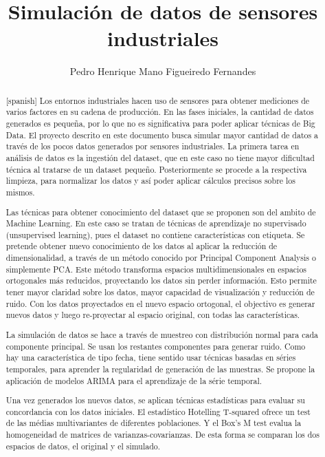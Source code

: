 \documentclass[11pt,spanish,listoffigures,listoftables]{tfgetsinf}
\title{Simulación de datos de sensores industriales}
\author{Pedro Henrique Mano Figueiredo Fernandes}
\begin{document}

\begin{abstract}[spanish]
Los entornos industriales hacen uso de sensores para obtener mediciones de varios factores en su cadena de producción. En las fases iniciales, la cantidad de datos generados es pequeña, por lo que no es significativa para poder aplicar técnicas de Big Data. El proyecto descrito en este documento busca simular mayor cantidad de datos a través de los pocos datos generados por sensores industriales. La primera tarea en análisis de datos es la ingestión del dataset, que en este caso no tiene mayor dificultad técnica al tratarse de un dataset pequeño. Posteriormente se procede a la respectiva limpieza, para normalizar los datos y así poder aplicar cálculos precisos sobre los mismos.

Las técnicas para obtener conocimiento del dataset que se proponen son del ambito de Machine Learning. En este caso se tratan de técnicas de aprendizaje no supervisado (unsupervised learning), pues el dataset no contiene  características con etiqueta. Se pretende obtener nuevo conocimiento de los datos al aplicar la reducción de dimensionalidad, a través de un método conocido por Principal Component Analysis o simplemente PCA. Este método transforma espacios multidimensionales en espacios ortogonales más reducidos, proyectando los datos sin perder información. Esto permite tener mayor claridad sobre los datos, mayor capacidad de visualización y reducción de ruido. Con los datos proyectados en el nuevo espacio ortogonal, el objectivo es generar nuevos datos y luego re-proyectar al espacio original, con todas las características.

La simulación de datos se hace a través de muestreo con distribución normal para cada componente principal. Se usan los restantes componentes para generar ruido. Como hay una característica de tipo fecha, tiene sentido usar técnicas basadas en séries temporales, para aprender la regularidad de generación de las muestras. Se propone la aplicación de modelos ARIMA para el aprendizaje de la série temporal.

Una vez generados los nuevos datos, se aplican técnicas estadísticas para evaluar su concordancia con los datos iniciales. El estadístico Hotelling T-squared ofrece un test de las médias multivariantes de diferentes poblaciones. Y el Box's M test evalua la homogeneidad de matrices de varianzas-covarianzas. De esta forma se comparan los dos espacios de datos, el original y el simulado.
\end{abstract}
\end{document}
